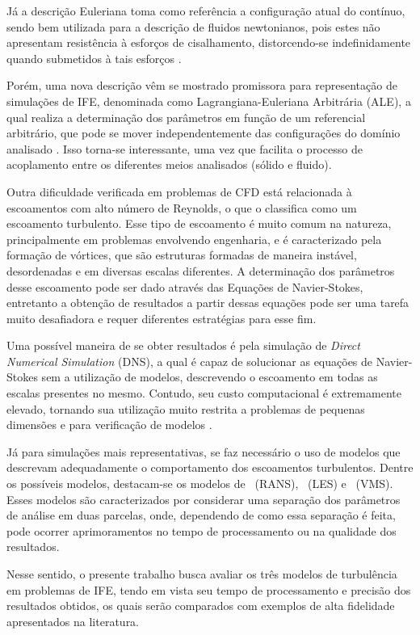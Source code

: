 \documentclass[_ArquivoPrincipal.tex]{subfiles}
\begin{document}
Já a descrição Euleriana toma como referência a configuração atual do contínuo, sendo bem utilizada para a descrição de fluidos newtonianos, pois estes não apresentam resistência à esforços de cisalhamento, distorcendo-se indefinidamente quando submetidos à tais esforços \cite{sanches2014fluid, fernandes2019ale}.

Porém, uma nova descrição vêm se mostrado promissora para representação de simulações de IFE, denominada como Lagrangiana-Euleriana Arbitrária (ALE), a qual realiza a determinação dos parâmetros em função de um referencial arbitrário, que pode se mover independentemente das configurações do domínio analisado \cite{donea1982arbitrary}. Isso torna-se interessante, uma vez que facilita o processo de acoplamento entre os diferentes meios analisados (sólido e fluido).

Outra dificuldade verificada em problemas de CFD está relacionada à escoamentos com alto número de Reynolds, o que o classifica como um escoamento turbulento. Esse tipo de escoamento é muito comum na natureza, principalmente em problemas envolvendo engenharia, e é caracterizado pela formação de vórtices, que são estruturas formadas de maneira instável, desordenadas e em diversas escalas diferentes. A determinação dos parâmetros desse escoamento pode ser dado através das Equações de Navier-Stokes, entretanto a obtenção de resultados a partir dessas equações pode ser uma tarefa muito desafiadora e requer diferentes estratégias para esse fim.

Uma possível maneira de se obter resultados é pela simulação de \textit{Direct Numerical Simulation} (DNS), a qual é capaz de solucionar as equações de Navier-Stokes sem a utilização de modelos, descrevendo o escoamento em todas as escalas presentes no mesmo. Contudo, seu custo computacional é extremamente elevado, tornando sua utilização muito restrita a problemas de pequenas dimensões e para verificação de modelos \cite{olad2022towards}.

Já para simulações mais representativas, se faz necessário o uso de modelos que descrevam adequadamente o comportamento dos escoamentos turbulentos. Dentre os possíveis modelos, destacam-se os modelos de \RANS\ (RANS), \LES\ (LES) e \VMS\ (VMS). Esses modelos são caracterizados por considerar uma separação dos parâmetros de análise em duas parcelas, onde, dependendo de como essa separação é feita, pode ocorrer aprimoramentos no tempo de processamento ou na qualidade dos resultados.

Nesse sentido, o presente trabalho busca avaliar os três modelos de turbulência em problemas de IFE, tendo em vista seu tempo de processamento e precisão dos resultados obtidos, os quais serão comparados com exemplos de alta fidelidade apresentados na literatura.
\end{document}
